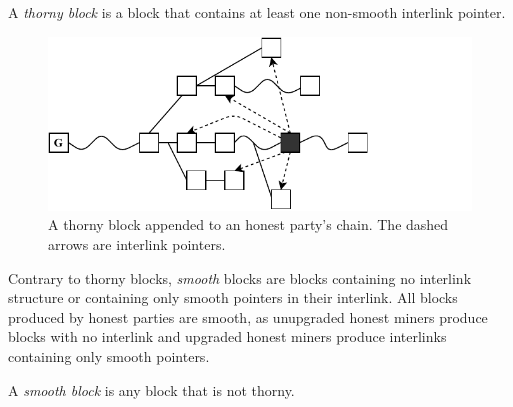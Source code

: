 \begin{definition}
	A \emph{thorny block} is a block that contains at least one non-smooth interlink pointer.
	\label{defn:thorny_block}
\end{definition}

\begin{figure}[h]
	\begin{center}
		\includegraphics[width=0.9\columnwidth]{figures/thorny_block.pdf}
	\end{center}
	\caption{A thorny block appended to an honest party's chain.
	The dashed arrows are interlink pointers.}
	\label{fig:thorny_block}
\end{figure}

Contrary to thorny blocks, \emph{smooth} blocks are blocks containing no interlink structure or containing only smooth pointers in their interlink. All blocks produced by honest parties are smooth, as unupgraded honest miners produce blocks with no interlink and upgraded honest miners produce interlinks containing only smooth pointers.

\begin{definition}
	A \emph{smooth block} is any block that is not thorny.
	\label{defn:smooth_block}
\end{definition}
